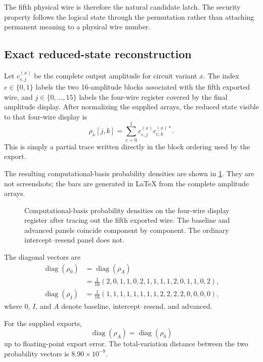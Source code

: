 The fifth physical wire is therefore the natural candidate latch. The security
property follows the logical state through the permutation rather than attaching
permanent meaning to a physical wire number.

\subsection{Exact reduced-state reconstruction}

Let $c^{(x)}_{e,j}$ be the complete output amplitude for circuit variant $x$.
The index $e\in\{0,1\}$ labels the two 16-amplitude blocks associated with the
fifth exported wire, and $j\in\{0,\ldots,15\}$ labels the four-wire register
covered by the final amplitude display. After normalizing the supplied arrays,
the reduced state visible to that four-wire display is
\begin{equation}
  \rho_x[j,k]
  =\sum_{e=0}^{1}c^{(x)}_{e,j}c^{(x)*}_{e,k}.
  \label{eq:caseii-partial-trace}
\end{equation}
This is simply a partial trace written directly in the block ordering used by
the export.

The resulting computational-basis probability densities are shown in
\cref{fig:caseii-probability-densities}. They are not screenshots; the bars are
generated in LaTeX from the complete amplitude arrays.

\begin{figure}[tbp]
\centering

\caption{Computational-basis probability densities on the four-wire display
register after tracing out the fifth exported wire. The baseline and advanced
panels coincide component by component. The ordinary intercept--resend panel
does not.}
\label{fig:caseii-probability-densities}
\end{figure}

The diagonal vectors are
\begin{align}
\operatorname{diag}(\rho_0)
&=\operatorname{diag}(\rho_A)\nonumber\\
&=\frac1{16}(2,0,1,1,0,2,1,1,1,1,2,0,1,1,0,2),
\label{eq:caseii-matching-diagonals}\\
\operatorname{diag}(\rho_I)
&=\frac1{16}(1,1,1,1,1,1,1,1,2,2,2,2,0,0,0,0),
\label{eq:caseii-intercept-diagonal}
\end{align}
where $0$, $I$, and $A$ denote baseline, intercept--resend, and advanced.

\begin{proposition}
For the supplied exports,
\begin{equation}
  \operatorname{diag}(\rho_A)=\operatorname{diag}(\rho_0)
\end{equation}
up to floating-point export error. The total-variation distance between the two
probability vectors is $8.90\times10^{-9}$.
\end{proposition}

